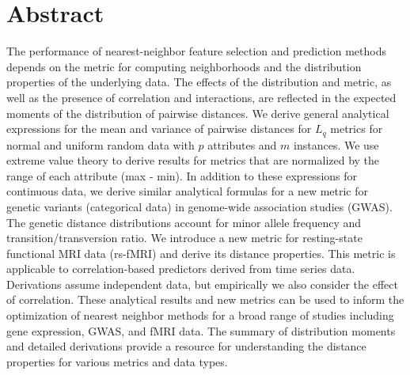 \documentclass[10pt,letterpaper]{article}
\begin{document}
\section*{Abstract}
	The performance of nearest-neighbor feature selection and prediction methods depends on the metric for computing neighborhoods and the distribution properties of the underlying data. The effects of the distribution and metric, as well as the presence of correlation and interactions, are reflected in the expected moments of the distribution of pairwise distances. We derive general analytical expressions for the mean and variance of pairwise distances for $L_q$ metrics for normal and uniform random data with $p$ attributes and $m$ instances. We use extreme value theory to derive results for metrics that are normalized by the range of each attribute (max - min). In addition to these expressions for continuous data, we derive similar analytical formulas for a new metric for genetic variants (categorical data) in genome-wide association studies (GWAS). The genetic distance distributions account for minor allele frequency and transition/transversion ratio. We introduce a new metric for resting-state functional MRI data (rs-fMRI) and derive its distance properties. This metric is applicable to correlation-based predictors derived from time series data. Derivations assume independent data, but empirically we also consider the effect of correlation. These analytical results and new metrics can be used to inform the optimization of nearest neighbor methods for a broad range of studies including gene expression, GWAS, and fMRI data. The summary of distribution moments and detailed derivations provide a resource for understanding the distance properties for various metrics and data types.


\end{document}

